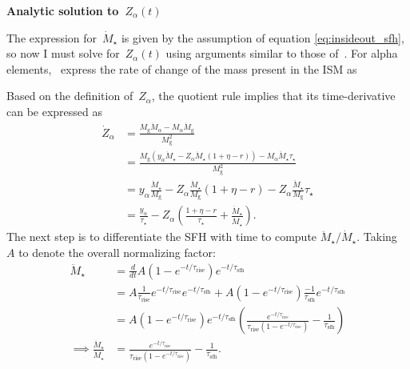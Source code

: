 \documentclass[12pt]{article}
\newcommand{\timescale}[1]{\ensuremath{\tau_\text{#1}}}
\begin{document}
\par\null\par\noindent
\textbf{Analytic solution to~$Z_\alpha(t)$}
\par\noindent
The expression for~$\dot{M}_\star$ is given by the assumption of equation
\ref{eq:insideout_sfh}, so now I must solve for~$Z_\alpha(t)$ using arguments
similar to those of~\citet*{Weinberg2017}.
For alpha elements,~\citet*{Weinberg2017} express the rate of change of the
mass present in the ISM as
\par
Based on the definition of~$Z_\alpha$, the quotient rule implies that its
time-derivative can be expressed as
\begin{subequations}\begin{align}
\dot{Z}_\alpha &= \frac{
	M_\text{g} \dot{M}_\alpha - M_\alpha \dot{M}_\text{g}
}{
	M_\text{g}^2
}
\\
&= \frac{
	M_\text{g} (y_\alpha \dot{M}_\star - Z_\alpha \dot{M}_\star (1 + \eta - r))
	- M_\alpha \ddot{M}_\star \tau_\star
}{
	M_\text{g}^2
}
\\
&= y_\alpha \frac{\dot{M}_\star}{M_\text{g}} -
Z_\alpha \frac{\dot{M}_\star}{M_\text{g}}(1 + \eta - r) -
Z_\alpha \frac{\ddot{M}_\star}{M_\text{g}} \tau_\star
\\
&= \frac{y_\alpha}{\tau_\star} -
Z_\alpha \left(\frac{1 + \eta - r}{\tau_\star} +
\frac{\ddot{M}_\star}{\dot{M}_\star}\right).
\end{align}\end{subequations}
The next step is to differentiate the SFH with time to compute
$\ddot{M}_\star / \dot{M}_\star$. Taking~$A$ to denote the overall normalizing
factor:
\begin{subequations}\begin{align}
\ddot{M}_\star &= \frac{d}{dt}
A(1 - e^{-t / \timescale{rise}}) e^{-t / \timescale{sfh}}
\\
&= A \frac{1}{\timescale{rise}}e^{-t / \timescale{rise}}
e^{-t / \timescale{sfh}} +
A(1 - e^{-t / \timescale{rise}}) \frac{-1}{\timescale{sfh}}
e^{-t / \timescale{sfh}}
\\
&= A(1 - e^{-t / \timescale{rise}})e^{-t / \timescale{sfh}}
\left(\frac{
	e^{-t / \timescale{rise}}
}{
	\timescale{rise}(1 - e^{-t / \timescale{rise}})
} - \frac{1}{\timescale{sfh}}
\right)
\\
\implies \frac{\ddot{M}_\star}{\dot{M}_\star} &= \frac{
	e^{-t / \timescale{rise}}
}{
	\timescale{rise}(1 - e^{-t / \timescale{rise}})
} - \frac{1}{\timescale{sfh}}.
\label{eq:mddotstar-over-mdotstar}
\end{align}\end{subequations}
\end{document}
